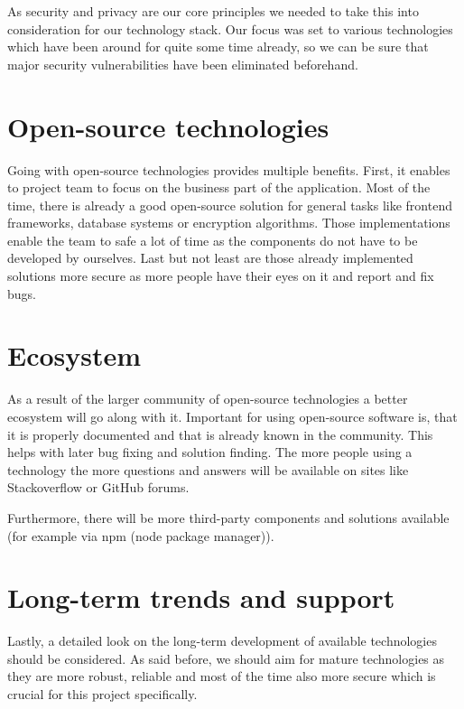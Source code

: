 As security and privacy are our core principles we needed to take this into consideration for our technology stack.
Our focus was set to various technologies which have been around for quite some time already, so we can be sure that
major security vulnerabilities have been eliminated beforehand.

\section{Open-source technologies}\label{sec:open-source-technologies}

Going with open-source technologies provides multiple benefits.
First, it enables to project team to focus on the business part of the application.
Most of the time, there is already a good open-source solution for general tasks like frontend frameworks, database
systems or encryption algorithms.
Those implementations enable the team to safe a lot of time as the components do not have to be developed by ourselves.
Last but not least are those already implemented solutions more secure as more people have their eyes on it and report
and fix bugs.

\section{Ecosystem}\label{sec:ecosystem}

As a result of the larger community of open-source technologies a better ecosystem will go along with it.
Important for using open-source software is, that it is properly documented and that is already known in the community.
This helps with later bug fixing and solution finding.
The more people using a technology the more questions and answers will be available on sites like Stackoverflow or
GitHub forums.

Furthermore, there will be more third-party components and solutions available
(for example via npm (node package manager)).

\section{Long-term trends and support}\label{sec:long-term-trends-and-support}

Lastly, a detailed look on the long-term development of available technologies should be considered.
As said before, we should aim for mature technologies as they are more robust, reliable and most of the time also more
secure which is crucial for this project specifically.

